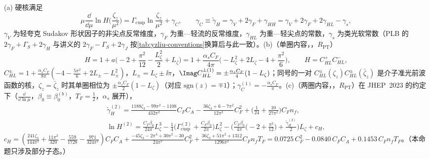 \begin{proposition}\label{prop:yzliu-hard-kernel}
(a) 硬核满足
\begin{equation}\label{eq:yzliu-H-rge}
\mu\frac{\dd}{\dd\mu}\ln H\Big(\frac{\zeta_z}{\mu^2}\Big)=\Gamma_{\mathrm{cusp}}\ln\frac{\zeta_z}{\mu^2}+\gamma_C,\qquad \gamma_C\equiv\tilde\gamma_H=\gamma_V+2\gamma_F+\gamma_{HH}=\gamma_V+2\gamma_F+2\gamma_{HL}-\gamma_s ,
\end{equation}
$\gamma_V$ 为轻夸克 Sudakov 形状因子的非尖点反常维度，$\gamma_F$ 为重—轻流的反常维度，$\gamma_{HL}$ 为重—轻尖点的常数，$\gamma_s$ 为类光软常数\cite[式~(A.11)]{Ji:2023pba}（PLB 的 $2\gamma_F+\Gamma_S+2\gamma_H$ 与讲义的 $2\gamma_F-\Gamma_S+2\gamma_J$ 按\cref{tab:yzliu-conventions}换算后与此一致）。(b)（单圈内容，\tagR，$R_{\mathrm{PT}}$）%
\begin{equation}\label{eq:yzliu-H1}
H=1+a\Big(-2+\frac{\pi^2}{12}-\frac{L_\zeta^2}{2}+L_\zeta\Big)=1+\frac{\alpha_sC_F}{4\pi}\Big(-L_\zeta^2+2L_\zeta-4+\frac{\pi^2}{6}\Big),\qquad H=C^+_{HL}C^-_{HL},
\end{equation}
$C^\pm_{HL}=1+\frac{\alpha_sC_F}{8\pi}(-4-\frac{5\pi^2}{6}+2L_\pm-L_\pm^2)$，$L_\pm=L_\zeta\pm\ii\pi$，$\Imag C^{\pm(1)}_{HL}=\pm\frac{\alpha_sC_F}{4}(1-L_\zeta)$；同号的一对 $C^\pm_{HL}(\zeta_z)C^\pm_{HL}(\bar\zeta_z)$ 是介子准光前波函数的核，$\zeta_z=\bar\zeta_z$ 时其单圈相位为 $\pm\frac{\alpha_sC_F}{2}(1-L_\zeta)$（对应 $\mathrm{sgn}(z)=\mp1$）；$\gamma^{(1)}_C=-\frac{\alpha_sC_F}{\pi}$。(c)（两圈内容，\tagR，$R_{\mathrm{PT}}$）在 JHEP~2023 的约定下（$\frac{\dd}{\dd\ln\mu}$，$\beta_0\equiv\beta_0^{(b)}$，$T_F=\frac12$，$\alpha_s$ 展开），%
\begin{gather}
\tilde\gamma^{(2)}_H=\frac{1188\zeta_3-99\pi^2-1108}{432\pi^2}C_FC_A-\frac{36\zeta_3+6-7\pi^2}{12\pi^2}C_F^2+\Big(\frac1{24}+\frac{10}{27\pi^2}\Big)C_Fn_f,\label{eq:yzliu-gH2}\\
\ln H^{(2)}=\frac{C_F\beta_0}{24\pi}L_\zeta^3-\frac14\Big(\Gamma^{(2)}_{\mathrm{cusp}}+\frac{C_F\beta_0}{2\pi}\Big)L_\zeta^2-\Big(\frac{C_F\beta_0}{4\pi}\Big(-2+\frac{\pi^2}{12}\Big)+\frac{\tilde\gamma^{(2)}_H}{2}\Big)L_\zeta+c_H,\label{eq:yzliu-lnH2}
\end{gather}
$c_H=(\frac{241\zeta_3}{144\pi^2}+\frac{11\pi^2}{320}-\frac{559}{1728}-\frac{971}{324\pi^2})C_FC_A+\frac{-45\zeta_3-2\pi^4+30\pi^2-30}{24\pi^2}C_F^2+\frac{36\zeta_3+51\pi^2+1312}{1296\pi^2}C_Fn_fT_F=0.0725\,C_F^2-0.0840\,C_FC_A+0.1453\,C_Fn_fT_F$。（本命题只涉及部分子态。）
\end{proposition}

